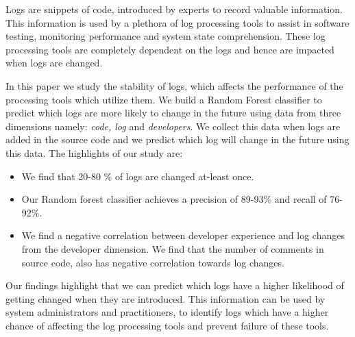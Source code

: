 Logs are snippets of code, introduced by experts to record valuable information. This information is used by a plethora of log processing tools to assist in software testing, monitoring performance and system state comprehension. These log processing tools are completely dependent on the logs and hence are impacted when logs are changed.

 In this paper we study the stability of logs, which affects the performance of the processing tools which utilize them. We build a Random Forest classifier to predict which logs are more likely to change in the future using data from three dimensions namely: \emph{code, log} and \emph{developers}. We collect this data when logs are added in the source code and we predict which log will change in the future using this data. The highlights of our study are:

\begin{itemize}
	\item We find that 20-80 \% of logs are changed at-least once.
	\item Our Random forest classifier achieves a precision of 89-93\% and recall of 76-92\%. 
	\item We find a negative correlation between developer experience and log changes from the developer dimension. We find that the number of comments in source code, also has negative correlation towards log changes. 
\end{itemize}

Our findings highlight that we can predict which logs have a higher likelihood of getting changed when they are introduced. This information can be used by system administrators and practitioners, to identify logs which have a higher chance of affecting the log processing tools and prevent failure of these tools.  